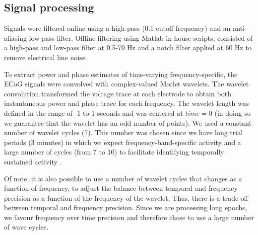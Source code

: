 \documentclass[11pt, onecolumn]{article}
\begin{document}
\subsection{Signal processing}
Signals were filtered online using a high-pass (0.1 cutoff frequency) and an anti-aliasing low-pass filter. %
Offline filtering using Matlab in house-scripts, consisted of a high-pass and low-pass filter at 0.5-70 Hz and a notch filter applied at 60 Hz to remove electrical line noise.

To extract power and phase estimates of time-varying frequency-specific, the ECoG signals were convolved with complex-valued Morlet wavelets. 
The  wavelet convolution transformed the voltage trace at each electrode to obtain both instantaneous power and phase trace for each frequency.
The wavelet length was defined in the range of -1 to 1 seconds and was centered at $time = 0$ (in doing so we guarantee that the wavelet has an odd number of points). 
We used a constant number of wavelet cycles (7). This number was chosen since we have long trial  periods (3 minutes) in which we expect frequency-band-specific activity and a large number  of cycles (from 7 to 10) to facilitate  identifying  temporally sustained  activity \citep{cohen2014analyzing}. 

Of note, it is also possible to use a number of wavelet cycles that changes as a function of frequency, to adjust the balance between temporal and frequency precision as a function of the frequency of the wavelet. Thus, there is a trade-off between temporal and frequency precision. Since we are processing long epochs, we favour frequency over time precision and therefore chose to use a large number  of wave cycles.
\end{document}
